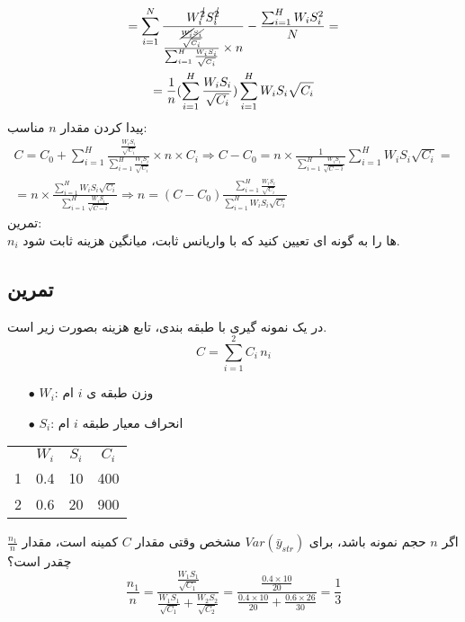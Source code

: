 \begin{enumerate}
\begin{multline*}
			=\sum_{i=1}^{N}\frac{W_i^{\cancel{2}}S_i^{\cancel{2}}}
			{\frac{\frac{\cancel{W_i}\cancel{S_i}}{\sqrt{C_i}}}{\sum_{i=1}^{H}\frac{W_iS_i}{\sqrt{C_i}}}\times n}
			-\frac{\sum_{i=1}^{H}W_iS_i^2}{N}
			=\\=
			\frac{1}{n}(\sum_{i=1}^{H}\frac{W_iS_i}{\sqrt{C_i}})\sum_{i=1}^{H}W_i S_i \sqrt{C_i}
		\end{multline*}
		پیدا کردن مقدار 
		$n$
		مناسب:
		\begin{multline*}
			C=C_0+\sum_{i=1}^{H}\frac{\frac{W_iS_i}{\sqrt{C_i}}}{\sum_{i=1}^{H}\frac{W_iS_i}{\sqrt{C_i}}}\times n\times C_i
			\Rightarrow C-C_0=n\times \frac{1}{\sum_{i=1}^{H}\frac{W_iS_i}{\sqrt{C-i}}}\sum_{i=1}^{H}W_iS_i\sqrt{C_i}
			=\\=
			n\times\frac{\sum_{i=1}^{H}W_iS_i\sqrt{C_i}}{\sum_{i=1}^{H}\frac{W_iS_i}{\sqrt{C-i}}}
			\Rightarrow n=(C-C_0)\frac{\sum_{i=1}^{H}\frac{W_iS_i}{\sqrt{C_i}}}{\sum_{i=1}^{H}W_iS_i\sqrt{C_i}}
		\end{multline*}
		تمرین:
		\\
		$n_i$
		ها را به گونه ای تعیین کنید که با واریانس ثابت، میانگین هزینه ثابت شود.
		\subsection*{تمرین}
		در یک نمونه گیری با طبقه بندی، تابع هزینه بصورت زیر است.
		\begin{equation*}
			C=\sum_{i=1}^{2}C_i\,n_i
		\end{equation*}
		\begin{itemize}
			\item[$\bullet$] $W_i$: وزن طبقه ی 
			$i$
			ام
			\item[$\bullet$] $S_i$: انحراف معیار طبقه 
			$i$
			ام
		\end{itemize}
		\begin{LTR}
			\begin{tabular}{c|ccc}
				\lr{H} & $W_i$ & $S_i$ & $C_i$ \\
				1 & 0.4 & 10 & 400 \\
				2 & 0.6 & 20 & 900 
			\end{tabular}
		\end{LTR}
		اگر 
		$n$
		حجم نمونه باشد، برای 
		$Var(\bar{y}_{str})$
		مشخص وقتی مقدار 
		$C$
		کمینه است، مقدار
		$\frac{n_1}{n}$
		چقدر است؟
		\begin{equation*}
			\frac{n_1}{n}=
			\frac
			{\frac{W_1S_1}{\sqrt{C_1}}}
			{\frac{W_1S_1}{\sqrt{C_1}}+\frac{W_2S_2}{\sqrt{C_2}}}
			=
			\frac
			{\frac{0.4\times 10}{20} }
			{\frac{0.4\times 10}{20}+\frac{0.6\times 26}{30}}
			=\frac{1}{3}
		\end{equation*}

\end{enumerate}
